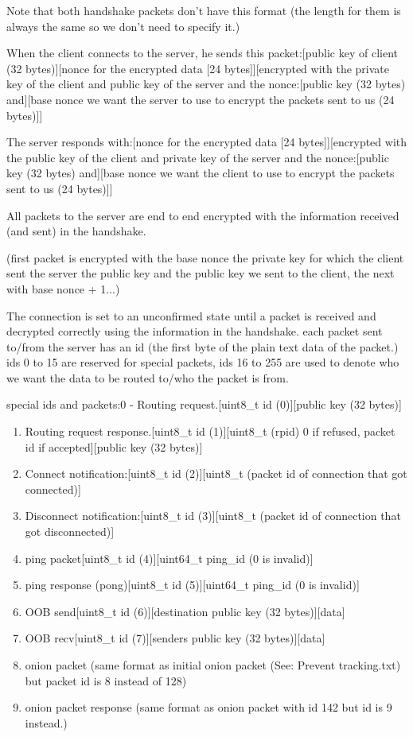 \documentclass{tox}
\begin{document}
Note that both handshake packets don't have this format (the length for them is always the same so we don't need to specify it.)

When the client connects to the server, he sends this packet:[public key of client (32 bytes)][nonce for the encrypted data [24 bytes]][encrypted with the private key of the client and public key of the server and the nonce:[public key (32 bytes) and][base nonce we want the server to use to encrypt the packets sent to us (24 bytes)]]

The server responds with:[nonce for the encrypted data [24 bytes]][encrypted with the public key of the client and private key of the server and the nonce:[public key (32 bytes) and][base nonce we want the client to use to encrypt the packets sent to us (24 bytes)]]

All packets to the server are end to end encrypted with the information received (and sent) in the handshake.

(first packet is encrypted with the base nonce the private key for which the client sent the server the public key and the public key we sent to the client, the next with base nonce + 1...)

The connection is set to an unconfirmed state until a packet is received and decrypted correctly using the information in the handshake.
each packet sent to/from the server has an id (the first byte of the plain text data of the packet.)
ids 0 to 15 are reserved for special packets, ids 16 to 255 are used to denote who we want the data to be routed to/who the packet is from.

special ids and packets:0 - Routing request.[uint8\_t id (0)][public key (32 bytes)]

\begin{enumerate}
\item Routing request response.[uint8\_t id (1)][uint8\_t (rpid) 0 if refused, packet id if accepted][public key (32 bytes)]
\item Connect notification:[uint8\_t id (2)][uint8\_t (packet id of connection that got connected)]
\item Disconnect notification:[uint8\_t id (3)][uint8\_t (packet id of connection that got disconnected)]
\item ping packet[uint8\_t id (4)][uint64\_t ping\_id (0 is invalid)]
\item ping response (pong)[uint8\_t id (5)][uint64\_t ping\_id (0 is invalid)]
\item OOB send[uint8\_t id (6)][destination public key (32 bytes)][data]
\item OOB recv[uint8\_t id (7)][senders public key (32 bytes)][data]
\item onion packet (same format as initial onion packet (See: Prevent tracking.txt) but packet id is 8 instead of 128)
\item onion packet response (same format as onion packet with id 142 but id is 9 instead.)
\end{enumerate}
\end{document}
